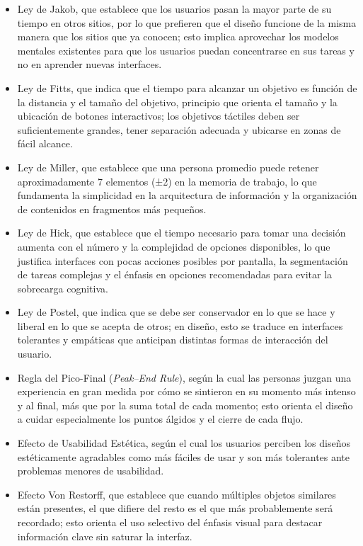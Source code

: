 \begin{itemize}
    \item Ley de Jakob, que establece que los usuarios pasan la mayor parte de su tiempo en otros sitios, por lo que prefieren que el diseño funcione de la misma manera que los sitios que ya conocen; esto implica aprovechar los modelos mentales existentes para que los usuarios puedan concentrarse en sus tareas y no en aprender nuevas interfaces.
    \item Ley de Fitts, que indica que el tiempo para alcanzar un objetivo es función de la distancia y el tamaño del objetivo, principio que orienta el tamaño y la ubicación de botones interactivos; los objetivos táctiles deben ser suficientemente grandes, tener separación adecuada y ubicarse en zonas de fácil alcance.
    \item Ley de Miller, que establece que una persona promedio puede retener aproximadamente 7 elementos (±2) en la memoria de trabajo, lo que fundamenta la simplicidad en la arquitectura de información y la organización de contenidos en fragmentos más pequeños.
    \item Ley de Hick, que establece que el tiempo necesario para tomar una decisión aumenta con el número y la complejidad de opciones disponibles, lo que justifica interfaces con pocas acciones posibles por pantalla, la segmentación de tareas complejas y el énfasis en opciones recomendadas para evitar la sobrecarga cognitiva.
    \item Ley de Postel, que indica que se debe ser conservador en lo que se hace y liberal en lo que se acepta de otros; en diseño, esto se traduce en interfaces tolerantes y empáticas que anticipan distintas formas de interacción del usuario.
    \item Regla del Pico-Final (\textit{Peak--End Rule}), según la cual las personas juzgan una experiencia en gran medida por cómo se sintieron en su momento más intenso y al final, más que por la suma total de cada momento; esto orienta el diseño a cuidar especialmente los puntos álgidos y el cierre de cada flujo.
    \item Efecto de Usabilidad Estética, según el cual los usuarios perciben los diseños estéticamente agradables como más fáciles de usar y son más tolerantes ante problemas menores de usabilidad.
    \item Efecto Von Restorff, que establece que cuando múltiples objetos similares están presentes, el que difiere del resto es el que más probablemente será recordado; esto orienta el uso selectivo del énfasis visual para destacar información clave sin saturar la interfaz.

\end{itemize}
